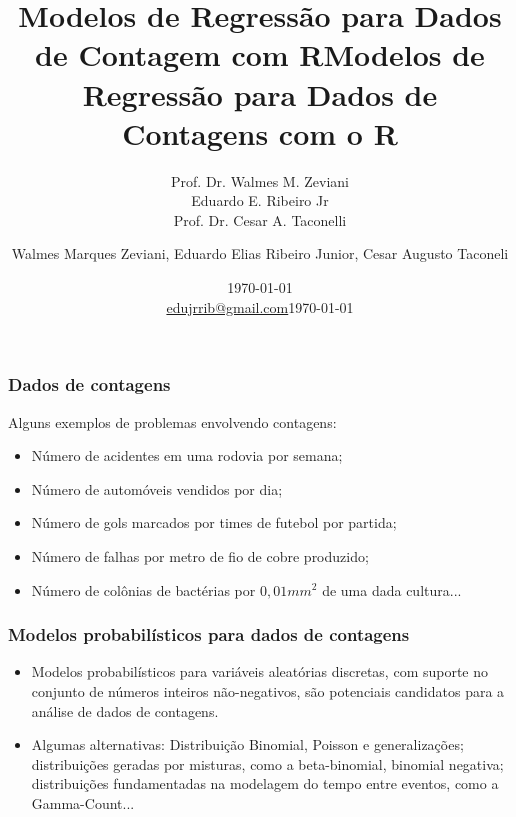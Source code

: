 \documentclass[10pt, aspectratio=169]{beamer}
\title{Modelos de Regressão para Dados de Contagem com R}
\author[Walmes Zeviani, Eduardo Jr \& Cesar Taconelli]{
  Prof. Dr. Walmes M. Zeviani\\
  Eduardo E. Ribeiro Jr\\ 
  Prof. Dr. Cesar A. Taconelli
}
\institute[UFPR]{
  Laboratório de Estatística e Geoinformação \\
  Departamento de Estatística \\
  Universidade Federal do Paraná}
\date{\today \\[0.1cm] \url{edujrrib@gmail.com}}
\begin{document}
\title[\sc{MRCR}]{Modelos de Regressão para Dados de Contagens com o R}

\author[Zeviani, W.M.; Ribeiro Jr, E.E.; Taconeli, C.A.]{Walmes Marques Zeviani, Eduardo Elias Ribeiro Junior, Cesar Augusto Taconeli}

\date{\today}

\begin{frame}
  \titlepage
\end{frame}

\renewcommand{\vec}[1]{\mathbf{#1}}






\begin{frame}\frametitle{Dados de contagens}
Alguns exemplos de problemas envolvendo contagens:

\vspace{0,2cm}
\begin{itemize}
\item Número de acidentes em uma rodovia por semana;
\item Número de automóveis vendidos por dia;
\item Número de gols marcados por times de futebol por partida;
\item Número de falhas por metro de fio de cobre produzido;
\item Número de colônias de bactérias por $0,01mm^{2}$ de uma dada cultura...
\end{itemize}
\end{frame}




\begin{frame}\frametitle{Modelos probabilísticos para dados de contagens}

\begin{itemize}
    \item Modelos probabilísticos para variáveis aleatórias discretas, com suporte no conjunto de números inteiros não-negativos, são potenciais candidatos para a análise de dados de contagens.
    
\vspace{0.5cm}    
    
    \item Algumas alternativas: Distribuição Binomial, Poisson e generalizações; distribuições geradas por misturas, como a beta-binomial, binomial negativa; distribuições fundamentadas na modelagem do tempo entre eventos, como a Gamma-Count...
    
   
\end{itemize}
\end{frame}
\end{document}
